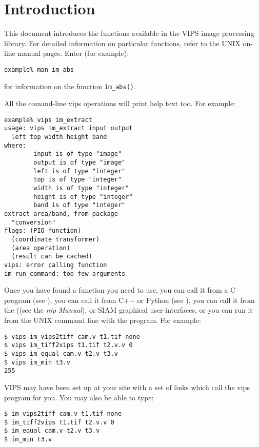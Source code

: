\section{Introduction}

This document introduces the functions available in the VIPS image
processing library.  For detailed information on particular functions,
refer to the UNIX on-line manual pages. Enter (for example):

\begin{verbatim}
example% man im_abs   
\end{verbatim}

for information on the function \verb+im_abs()+.

All the comand-line vips operations will print help text too. For example:

\begin{verbatim}
example% vips im_extract
usage: vips im_extract input output 
  left top width height band
where:
        input is of type "image"
        output is of type "image"
        left is of type "integer"
        top is of type "integer"
        width is of type "integer"
        height is of type "integer"
        band is of type "integer"
extract area/band, from package 
  "conversion"
flags: (PIO function) 
  (coordinate transformer) 
  (area operation) 
  (result can be cached)
vips: error calling function
im_run_command: too few arguments
\end{verbatim}

Once you have found a function you need to use, you can call it from a C
program (see ), you can call
it from C++ or Python (see ), you can call
it from the \nip{} ((see the \emph{nip Manual}), or SIAM graphical
user-interfaces, or you can run it from the UNIX command line with the
\vips{} program. For example:

\begin{verbatim}
$ vips im_vips2tiff cam.v t1.tif none
$ vips im_tiff2vips t1.tif t2.v.v 0
$ vips im_equal cam.v t2.v t3.v
$ vips im_min t3.v
255   
\end{verbatim}

VIPS may have been set up at your site with a set of links which call the
vips program for you. You may also be able to type:

\begin{verbatim}
$ im_vips2tiff cam.v t1.tif none
$ im_tiff2vips t1.tif t2.v.v 0
$ im_equal cam.v t2.v t3.v
$ im_min t3.v
\end{verbatim}

